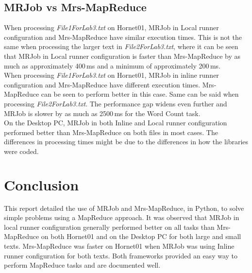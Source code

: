 \documentclass[10pt, twocolumn]{article}
\begin{document}
\subsection{MRJob vs Mrs-MapReduce}
When processing \emph{File1ForLab3.txt} on Hornet01, MRJob in Local runner configuration and Mrs-MapReduce have similar execution times. This is not the same when processing the larger text in \emph{File2ForLab3.txt}, where it can be seen that MRJob in Local runner configuration is faster than Mrs-MapReduce by as much as approximately 400\,ms and a minimum of approximately 200\,ms.\\

\noindent When processing \emph{File1ForLab3.txt} on Hornet01, MRJob in inline runner configuration and Mrs-MapReduce have different execution times. Mrs-MapReduce can be seen to perform better in this case. Same can be said when processing  \emph{File2ForLab3.txt}. The performance gap widens even further and MRJob is slower by as much as 2500\,ms for the Word Count task. \\

\noindent On the Desktop PC, MRJob in both Inline and Local runner configuration performed better than Mrs-MapReduce on both files in most cases. The differences in processing times might be due to the differences in how the libraries were coded.
\section{Conclusion}
%
This report detailed the use of MRJob and Mrs-MapReduce, in Python, to solve simple problems using a MapReduce approach. It was observed that MRJob in local runner configuration generally performed better on all tasks than Mrs-MapReduce on both Hornet01 and on the Desktop PC for both large and small texts. Mrs-MapReduce was faster on Hornet01 when MRJob was using Inline runner configuration for both texts. Both frameworks provided an easy way to perform MapReduce tasks and are documented well.
%


\cleardoublepage
\onecolumn
\appendix
\end{document}
